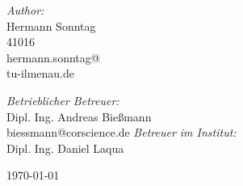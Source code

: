 \begin{titlepage}
\begin{center}
\begin{minipage}{0.4\textwidth}
\begin{flushleft} \large
\emph{Author:}\\
Hermann Sonntag \\
41016\\
hermann.sonntag@\\tu-ilmenau.de
\end{flushleft}
\end{minipage}
\begin{minipage}{0.4\textwidth}
\begin{flushright} \large
\emph{Betrieblicher Betreuer:} \\
Dipl. Ing. Andreas Bießmann \\
biessmann@corscience.de
\emph{Betreuer im Institut:} \\
Dipl. Ing. Daniel Laqua
\end{flushright}
\end{minipage}

\vfill

{\large \today}

\end{center}
\end{titlepage}
